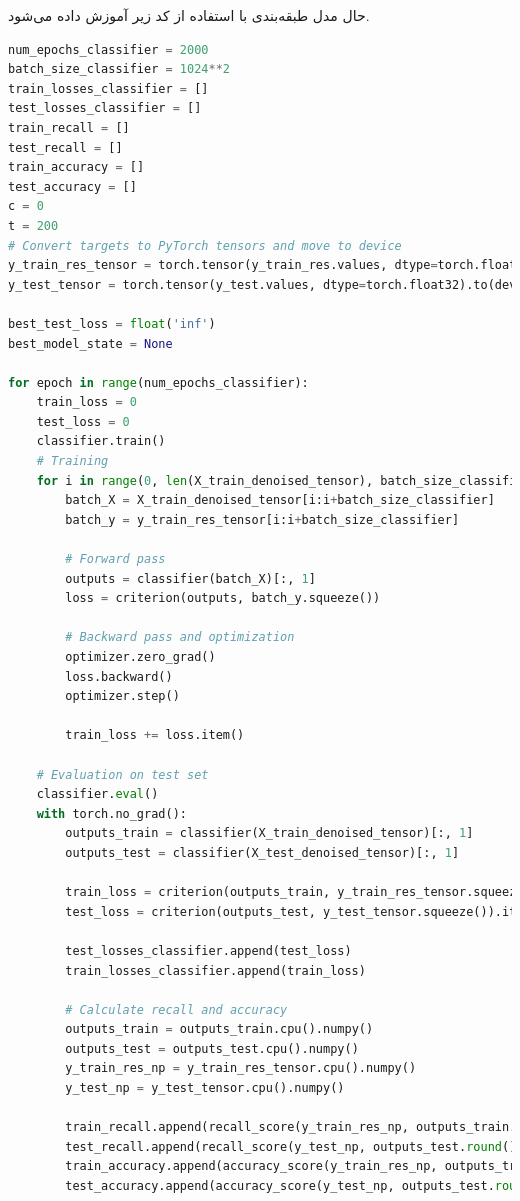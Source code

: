 \documentclass{article}
\begin{document}
حال مدل طبقه‌بندی با استفاده از کد زیر آموزش داده می‌شود.
\begin{LTR}
	\begin{lstlisting}[language=Python, caption=train model]
num_epochs_classifier = 2000
batch_size_classifier = 1024**2
train_losses_classifier = []
test_losses_classifier = []
train_recall = []
test_recall = []
train_accuracy = []
test_accuracy = []
c = 0
t = 200
# Convert targets to PyTorch tensors and move to device
y_train_res_tensor = torch.tensor(y_train_res.values, dtype=torch.float32).to(device).unsqueeze(1)
y_test_tensor = torch.tensor(y_test.values, dtype=torch.float32).to(device).unsqueeze(1)

best_test_loss = float('inf')
best_model_state = None

for epoch in range(num_epochs_classifier):
    train_loss = 0
    test_loss = 0
    classifier.train()
    # Training
    for i in range(0, len(X_train_denoised_tensor), batch_size_classifier):
        batch_X = X_train_denoised_tensor[i:i+batch_size_classifier]
        batch_y = y_train_res_tensor[i:i+batch_size_classifier]

        # Forward pass
        outputs = classifier(batch_X)[:, 1]
        loss = criterion(outputs, batch_y.squeeze())

        # Backward pass and optimization
        optimizer.zero_grad()
        loss.backward()
        optimizer.step()

        train_loss += loss.item()

    # Evaluation on test set
    classifier.eval()
    with torch.no_grad():
        outputs_train = classifier(X_train_denoised_tensor)[:, 1]
        outputs_test = classifier(X_test_denoised_tensor)[:, 1]

        train_loss = criterion(outputs_train, y_train_res_tensor.squeeze()).item()
        test_loss = criterion(outputs_test, y_test_tensor.squeeze()).item()

        test_losses_classifier.append(test_loss)
        train_losses_classifier.append(train_loss)

        # Calculate recall and accuracy
        outputs_train = outputs_train.cpu().numpy()
        outputs_test = outputs_test.cpu().numpy()
        y_train_res_np = y_train_res_tensor.cpu().numpy()
        y_test_np = y_test_tensor.cpu().numpy()

        train_recall.append(recall_score(y_train_res_np, outputs_train.round()))
        test_recall.append(recall_score(y_test_np, outputs_test.round()))
        train_accuracy.append(accuracy_score(y_train_res_np, outputs_train.round()))
        test_accuracy.append(accuracy_score(y_test_np, outputs_test.round()))


\end{lstlisting}
\end{LTR}
\end{document}

